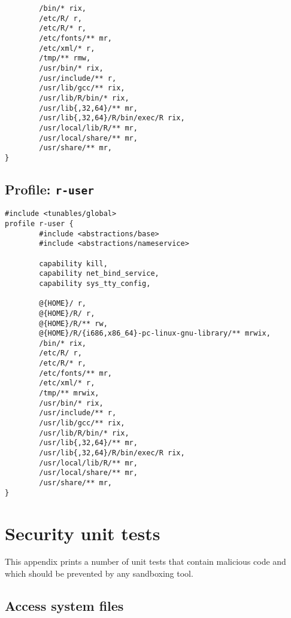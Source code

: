 \begin{appendix}
\begin{footnotesize}
\begin{verbatim}
        /bin/* rix,
        /etc/R/ r,
        /etc/R/* r,
        /etc/fonts/** mr,
        /etc/xml/* r,
        /tmp/** rmw,
        /usr/bin/* rix,
        /usr/include/** r,
        /usr/lib/gcc/** rix,    
        /usr/lib/R/bin/* rix,
        /usr/lib{,32,64}/** mr,
        /usr/lib{,32,64}/R/bin/exec/R rix,
        /usr/local/lib/R/** mr,
        /usr/local/share/** mr,
        /usr/share/** mr,
}
\end{verbatim}
\end{footnotesize}

\section{Profile: \texttt{r-user}}
\label{r-user}

\begin{footnotesize}
\begin{verbatim}
#include <tunables/global>
profile r-user {
        #include <abstractions/base>
        #include <abstractions/nameservice>
	
        capability kill,
        capability net_bind_service,
        capability sys_tty_config,
	
        @{HOME}/ r,
        @{HOME}/R/ r,
        @{HOME}/R/** rw,
        @{HOME}/R/{i686,x86_64}-pc-linux-gnu-library/** mrwix,
        /bin/* rix,
        /etc/R/ r,
        /etc/R/* r,
        /etc/fonts/** mr,
        /etc/xml/* r,
        /tmp/** mrwix,
        /usr/bin/* rix,
        /usr/include/** r,
        /usr/lib/gcc/** rix,		
        /usr/lib/R/bin/* rix,
        /usr/lib{,32,64}/** mr,
        /usr/lib{,32,64}/R/bin/exec/R rix,
        /usr/local/lib/R/** mr,
        /usr/local/share/** mr,
        /usr/share/** mr,
}
\end{verbatim}
\end{footnotesize}



\chapter{Security unit tests}

This appendix prints a number of unit tests that contain malicious code and
which should be prevented by any sandboxing tool.

\section{Access system files}


\end{appendix}
